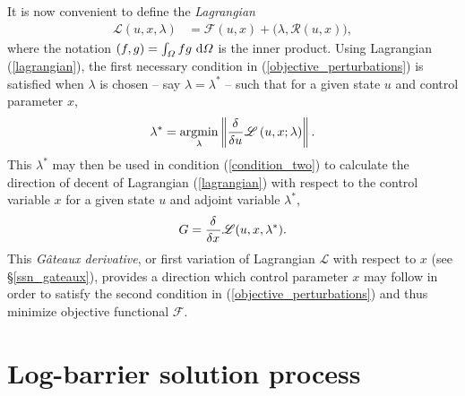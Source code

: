 It is now convenient to define the  \emph{Lagrangian}
\begin{align}
  \label{lagrangian}
  \mathscr{L}(u, x, \lambda) &= \mathscr{F}(u, x) + \big( \lambda, \mathscr{R}(u, x) \big),
\end{align}
where the notation $(f,g) = \int_{\varOmega} f g \ \mathrm{d}\varOmega$ is the inner product.  Using Lagrangian (\ref{lagrangian}), the first necessary condition in (\ref{objective_perturbations}) is satisfied when $\lambda$ is chosen -- say $\lambda = \lambda^*$ -- such that for a given state $u$ and control parameter $x$, 
\begin{align}
  \label{adjoint}
  \lambda^* = \operatorname*{argmin}\limits_{\lambda} \left\Vert \frac{\delta{^{}} }{\delta u{^{}} } \mathscr{L} \left( u, x; \lambda \right) \right\Vert.
\end{align}
This $\lambda^*$ may then be used in condition (\ref{condition_two}) to calculate the direction of decent of Lagrangian (\ref{lagrangian}) with respect to the control variable $x$ for a given state $u$ and adjoint variable $\lambda^*$,
\begin{align}
  G = \frac{\delta{^{}} }{\delta x{^{}} } \mathscr{L} (u, x, \lambda^*).
\end{align}
This \emph{G\^{a}teaux derivative}, or first variation of Lagrangian $\mathscr{L}$ with respect to $x$ (see \S \ref{ssn_gateaux}), provides a direction which control parameter $x$ may follow in order to satisfy the second condition in (\ref{objective_perturbations}) and thus minimize objective functional $\mathscr{F}$.


\section{Log-barrier solution process} \label{ssn_log_barrier}

